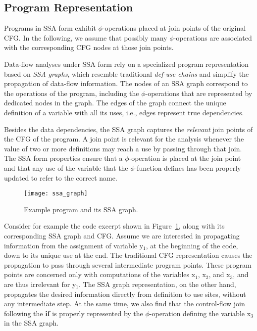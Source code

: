 \subsection{Program Representation}

Programs in SSA form exhibit $\phi$-operations placed at join
points of the original CFG. In the following, we assume that possibly many
$\phi$-operations are associated with the corresponding CFG nodes at those
join points.

Data-flow analyses under SSA form rely on a specialized program representation
based on \emph{SSA graphs}, which resemble traditional \emph{def-use chains} and
simplify the propagation of data-flow information. The nodes of an SSA graph
correspond to the operations of the program, including the 
$\phi$-operations that are represented by dedicated nodes in the graph. The
edges of the graph connect the unique definition of a variable with all its
uses, i.e., edges represent true dependencies.

Besides the data dependencies, the SSA graph captures the \emph{relevant} join 
points of the CFG of the program. A join point
is relevant for the analysis whenever the value of two or more definitions may
reach a use by passing through that join. The SSA form properties ensure that
a $\phi$-operation is placed at the join point and that any use of the variable
that the $\phi$-function defines has been properly updated to refer to the
correct name.

\begin{figure}[t]
  \texttt{[image: ssa\_graph]}
  \caption{Example program and its SSA graph.}
  \label{novillo:fig:ssa_graph}
\end{figure}

Consider for example the code excerpt shown in
Figure~\ref{novillo:fig:ssa_graph}, along with its corresponding SSA graph and
CFG. Assume we are interested in propagating information from the assignment of
variable y$_1$, at the beginning of the code, down to its unique use at
the end. The traditional CFG representation causes the propagation
to pass through several intermediate program points. These program points are
concerned only with computations of the variables x$_1$, x$_2$, and x$_3$, and
are thus irrelevant for y$_1$. The SSA graph representation, on
the other hand, propagates the desired information directly from definition to
use sites, without
any intermediate step. At the same time, we also find that the control-flow
join following the \textbf{if} is properly represented by the $\phi$-operation
defining the variable x$_3$ in the SSA graph.

